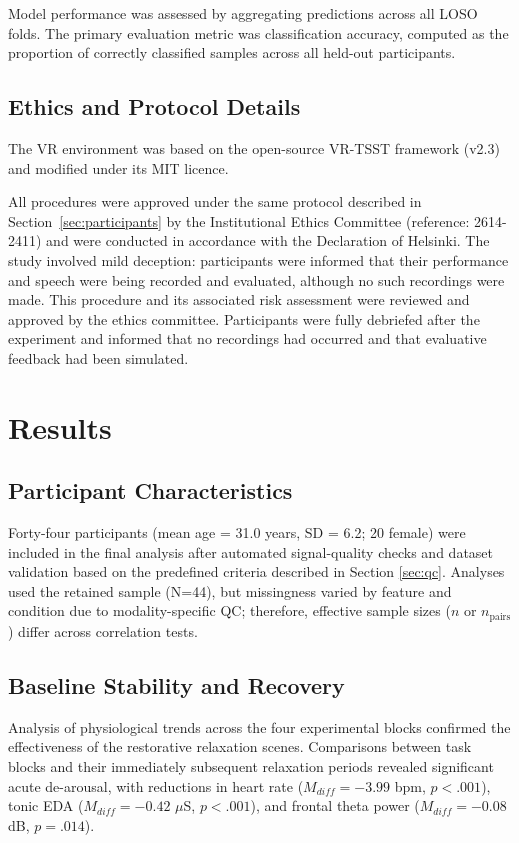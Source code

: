 \documentclass[lettersize,journal]{IEEEtran}
\begin{document}
Model performance was assessed by aggregating predictions across all LOSO folds. The primary evaluation metric was classification accuracy, computed as the proportion of correctly classified samples across all held-out participants.

\subsection{Ethics and Protocol Details}
The VR environment was based on the open-source VR-TSST framework (v2.3) and modified under its MIT licence.

All procedures were approved under the same protocol described in Section~\ref{sec:participants} by the Institutional Ethics Committee (reference: 2614-2411) and were conducted in accordance with the Declaration of Helsinki. 
The study involved mild deception: participants were informed that their performance and speech were being recorded and evaluated, although no such recordings were made. 
This procedure and its associated risk assessment were reviewed and approved by the ethics committee. 
Participants were fully debriefed after the experiment and informed that no recordings had occurred and that evaluative feedback had been simulated.

\section{Results}

\subsection {Participant Characteristics}

Forty-four participants (mean age = 31.0 years, SD = 6.2; 20 female) were included in the final analysis after automated signal-quality checks and dataset validation based on the predefined criteria described in Section \ref{sec:qc}. Analyses used the retained sample (N=44), but missingness varied by feature and condition due to modality-specific QC; therefore, effective sample sizes ($n$ or $n_{\mathrm{pairs}}$) differ across correlation tests.


\subsection{Baseline Stability and Recovery}
Analysis of physiological trends across the four experimental blocks confirmed the effectiveness of the restorative relaxation scenes. Comparisons between task blocks and their immediately subsequent relaxation periods revealed significant acute de-arousal, with reductions in heart rate ($M_{diff} = -3.99$ bpm, $p < .001$), tonic EDA ($M_{diff} = -0.42$ $\mu$S, $p < .001$), and frontal theta power ($M_{diff} = -0.08$ dB, $p = .014$).
\end{document}
